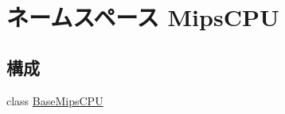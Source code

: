 \hypertarget{namespaceMipsCPU}{
\section{ネームスペース MipsCPU}
\label{namespaceMipsCPU}
}
\subsection*{構成}
\begin{DoxyCompactItemize}
\item 
class \hyperlink{classMipsCPU_1_1BaseMipsCPU}{BaseMipsCPU}
\end{DoxyCompactItemize}
